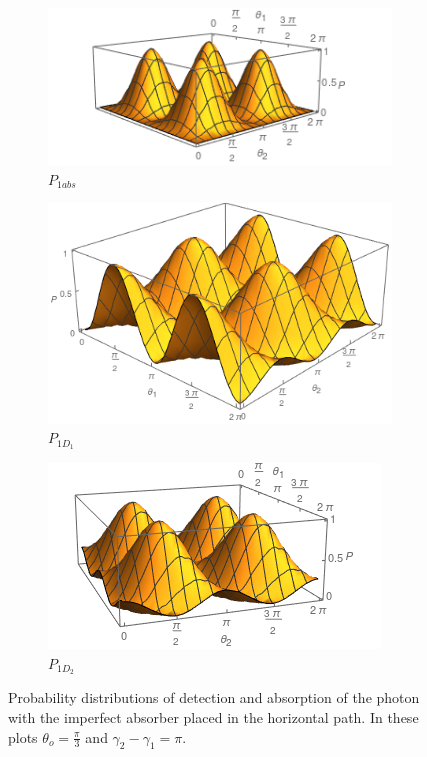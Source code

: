 \documentclass{book}
\begin{document}
\begin{figure}[H]
\centering
\begin{subfigure}[b]{0.45\linewidth}
\includegraphics[width=\linewidth]{images/P11abs.png}
\caption{$P_{1abs}$}
\label{fig:BS1}
\end{subfigure}
\begin{subfigure}[b]{0.45\linewidth}
\includegraphics[width=\linewidth ,height=3 cm]{images/P11d1.png}
\caption{$P_{1D_{1}}$}
\label{fig:westminster_aerea}
\end{subfigure}
\begin{subfigure}[b]{0.45\linewidth}
\includegraphics[width=\linewidth]{images/P11d2.png}
\caption{$P_{1D_{2}}$}
\label{fig:BS1}
\end{subfigure}
\caption{Probability distributions of detection and absorption of the photon with the imperfect absorber placed in the horizontal path. In these plots $\theta_{o}=\frac{\pi}{3}$ and $\gamma_{2}-\gamma_{1}=\pi$.}
\label{P_bs2}
\end{figure}
\end{document}
